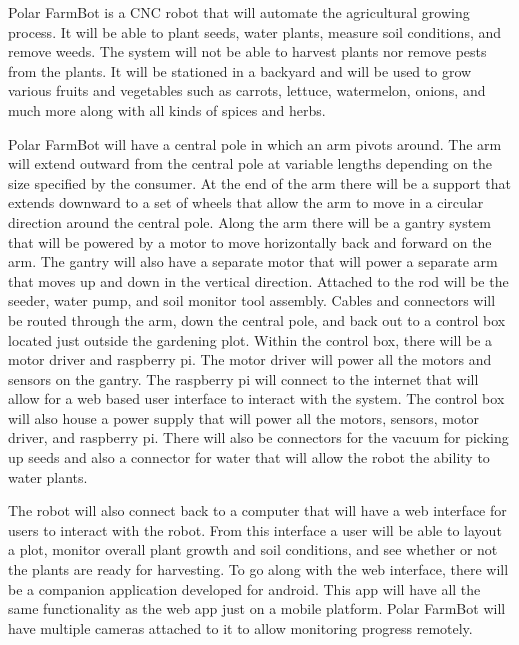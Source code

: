 Polar FarmBot is a CNC robot that will automate the agricultural growing process. It will be able to plant seeds, water plants, measure soil conditions, and remove weeds. The system will not be able to harvest plants nor remove pests from the plants. It will be stationed in a backyard and will be used to grow various fruits and vegetables such as carrots, lettuce, watermelon, onions, and much more along with all kinds of spices and herbs.

Polar FarmBot will have a central pole in which an arm pivots around. The arm will extend outward from the central pole at variable lengths depending on the size specified by the consumer. At the end of the arm there will be a support that extends downward to a set of wheels that allow the arm to move in a circular direction around the central pole. Along the arm there will be a gantry system that will be powered by a motor to move horizontally back and forward on the arm. The gantry will also have a separate motor that will power a separate arm that moves up and down in the vertical direction. Attached to the rod will be the seeder, water pump, and soil monitor tool assembly. Cables and connectors will be routed through the arm, down the central pole, and back out to a control box located just outside the gardening plot. Within the control box, there will be a motor driver and raspberry pi. The motor driver will power all the motors and sensors on the gantry. The raspberry pi will connect to the internet that will allow for a web based user interface to interact with the system. The control box will also house a power supply that will power all the motors, sensors, motor driver, and raspberry pi. There will also be connectors for the vacuum for picking up seeds and also a connector for water that will allow the robot the ability to water plants.

The robot will also connect back to a computer that will have a web interface for users to interact with the robot. From this interface a user will be able to layout a plot, monitor overall plant growth and soil conditions, and see whether or not the plants are ready for harvesting. To go along with the web interface, there will be a companion application developed for android. This app will have all the same functionality as the web app just on a mobile platform. Polar FarmBot will have multiple cameras attached to it to allow monitoring progress remotely.